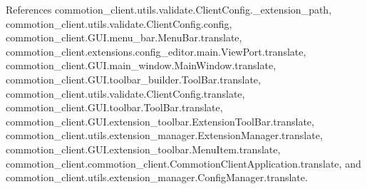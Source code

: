 References commotion\-\_\-client.\-utils.\-validate.\-Client\-Config.\-\_\-extension\-\_\-path, commotion\-\_\-client.\-utils.\-validate.\-Client\-Config.\-config, commotion\-\_\-client.\-G\-U\-I.\-menu\-\_\-bar.\-Menu\-Bar.\-translate, commotion\-\_\-client.\-extensions.\-config\-\_\-editor.\-main.\-View\-Port.\-translate, commotion\-\_\-client.\-G\-U\-I.\-main\-\_\-window.\-Main\-Window.\-translate, commotion\-\_\-client.\-G\-U\-I.\-toolbar\-\_\-builder.\-Tool\-Bar.\-translate, commotion\-\_\-client.\-utils.\-validate.\-Client\-Config.\-translate, commotion\-\_\-client.\-G\-U\-I.\-toolbar.\-Tool\-Bar.\-translate, commotion\-\_\-client.\-G\-U\-I.\-extension\-\_\-toolbar.\-Extension\-Tool\-Bar.\-translate, commotion\-\_\-client.\-utils.\-extension\-\_\-manager.\-Extension\-Manager.\-translate, commotion\-\_\-client.\-G\-U\-I.\-extension\-\_\-toolbar.\-Menu\-Item.\-translate, commotion\-\_\-client.\-commotion\-\_\-client.\-Commotion\-Client\-Application.\-translate, and commotion\-\_\-client.\-utils.\-extension\-\_\-manager.\-Config\-Manager.\-translate.



